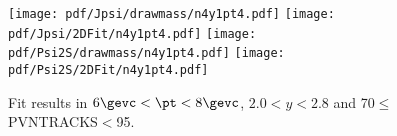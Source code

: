 \begin{figure}[H]
\begin{center}
\texttt{[image: pdf/Jpsi/drawmass/n4y1pt4.pdf]}
\texttt{[image: pdf/Jpsi/2DFit/n4y1pt4.pdf]}
\vspace*{-0.5cm}
\texttt{[image: pdf/Psi2S/drawmass/n4y1pt4.pdf]}
\texttt{[image: pdf/Psi2S/2DFit/n4y1pt4.pdf]}
\vspace*{-0.5cm}
\end{center}
\caption{Fit results in $6\gevc<\pt<8\gevc$, $2.0<y<2.8$ and 70$\leq$PVNTRACKS$<$95.}
\label{Fitn4y1pt4}
\end{figure}
